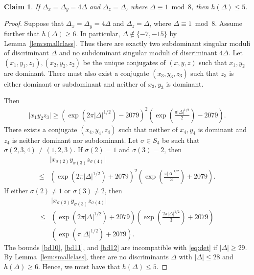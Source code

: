 \documentclass[11pt,a4paper, british]{amsart}
\newtheorem{claim}[thm]{Claim}
\theoremstyle{definition}
\theoremstyle{remark}
\numberwithin{equation}{section}
\begin{document}
\begin{claim}\label{cl11}
	If $\Delta_x = \Delta_y = 4 \Delta$ and $\Delta_z = \Delta$, where $\Delta \equiv 1 \bmod 8$, then $h(\Delta) \leq 5$.
\end{claim}

\begin{proof}
	Suppose that $\Delta_x = \Delta_y = 4 \Delta$ and $\Delta_z = \Delta$, where $\Delta \equiv 1 \bmod 8$. Assume further that $h(\Delta) \geq 6$. In particular, $\Delta \notin \{-7, -15\}$ by Lemma~\ref{lem:smallclass}. Thus there are exactly two subdominant singular moduli of discriminant $\Delta$ and no subdominant singular moduli of discriminant $4 \Delta$. Let $(x_1, y_1, z_1), (x_2, y_2, z_2)$ be the unique conjugates of $(x, y, z)$ such that $x_1, y_2$ are dominant. There must also exist a conjugate $(x_3, y_3, z_3)$ such that $z_3$ is either dominant or subdominant and neither of $x_3, y_3$ is dominant.
	
	Then 
	\begin{align}\label{bd10}
		\lvert x_1 y_2 z_3 \rvert \geq (\exp(2 \pi \lvert \Delta \rvert^{1/2}) - 2079)^2\left(\exp\left(\frac{\pi \lvert \Delta \rvert^{1/2}}{2}\right) - 2079\right).
	\end{align}
There exists a conjugate $(x_4, y_4, z_4)$ such that neither of $x_4, y_4$ is dominant and $z_4$ is neither dominant nor subdominant. Let $\sigma \in S_4$ be such that $\sigma(2, 3, 4) \neq (1, 2, 3)$. If $\sigma(2)=1$ and $\sigma(3)=2$, then
	\begin{align}\label{bd11}
		&\lvert x_{\sigma(2)} y_{\sigma(3)} z_{\sigma(4)} \rvert \nonumber \\ 
		\leq &(\exp(2 \pi \lvert \Delta \rvert^{1/2}) + 2079)^2\left(\exp\left(\frac{\pi \lvert \Delta \rvert^{1/2}}{3}\right) + 2079\right).
	\end{align}
	If either $\sigma(2) \neq 1$ or $\sigma(3) \neq 2$, then
	\begin{align}\label{bd12}
		&\lvert x_{\sigma(2)} y_{\sigma(3)} z_{\sigma(4)} \rvert \nonumber \\
		\leq &(\exp(2 \pi \lvert \Delta \rvert^{1/2}) + 2079)\left(\exp\left(\frac{2 \pi \lvert \Delta \rvert^{1/2}}{3}\right) + 2079\right) \nonumber \\
		&(\exp(\pi \lvert \Delta \rvert^{1/2}) + 2079).
	\end{align}
	The bounds \eqref{bd10}, \eqref{bd11}, and \eqref{bd12} are incompatible with \eqref{eq:det} if $\lvert \Delta \rvert \geq 29$. By Lemma~\ref{lem:smallclass}, there are no discriminants $\Delta$ with $\lvert \Delta \rvert \leq 28$ and $h(\Delta) \geq 6$. Hence, we must have that $h(\Delta) \leq 5$.
\end{proof}
\end{document}

